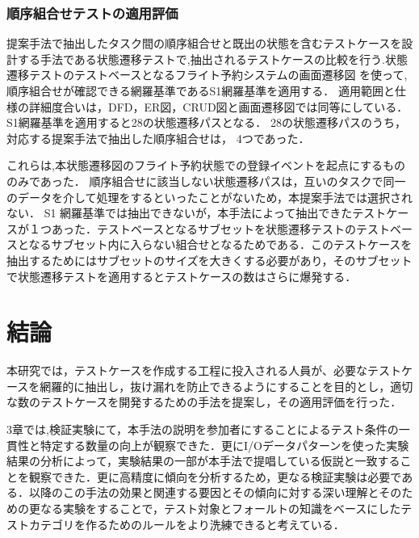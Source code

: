 \documentclass[10pt,a4j]{jarticle}
\begin{document}
\subsubsection{順序組合せテストの適用評価} \label{sec:5-2-2}
提案手法で抽出したタスク間の順序組合せと既出の状態を含むテストケースを設計する手法である状態遷移テストで,抽出されるテストケースの比較を行う.状態遷移テストのテストベースとなるフライト予約システムの画面遷移図
を使って,順序組合せが確認できる網羅基準であるS1網羅基準を適用する．
適用範囲と仕様の詳細度合いは，DFD，ER図，CRUD図と画面遷移図では同等にしている．
S1網羅基準を適用すると28の状態遷移パスとなる．
28の状態遷移パスのうち，対応する提案手法で抽出した順序組合せは，
4つであった．

これらは,本状態遷移図のフライト予約状態での登録イベントを起点にするもののみであった．
順序組合せに該当しない状態遷移パスは，互いのタスクで同一のデータを介して処理をするといったことがないため，本提案手法では選択されない．
S1 網羅基準では抽出できないが，本手法によって抽出できたテストケースが１つあった．テストベースとなるサブセットを状態遷移テストのテストベースとなるサブセット内に入らない組合せとなるためである．このテストケースを抽出するためにはサブセットのサイズを大きくする必要があり，そのサブセットで状態遷移テストを適用するとテストケースの数はさらに爆発する．

\section{結論} \label{chap:6}

本研究では，テストケースを作成する工程に投入される人員が、必要なテストケースを網羅的に抽出し，抜け漏れを防止できるようにすることを目的とし，適切な数のテストケースを開発するための手法を提案し，その適用評価を行った．

3章では,検証実験にて，本手法の説明を参加者にすることによるテスト条件の一貫性と特定する数量の向上が観察できた．更にI/Oデータパターンを使った実験結果の分析によって，実験結果の一部が本手法で提唱している仮説と一致することを観察できた．更に高精度に傾向を分析するため，更なる検証実験は必要である．以降のこの手法の効果と関連する要因とその傾向に対する深い理解とそのための更なる実験をすることで，テスト対象とフォールトの知識をベースにしたテストカテゴリを作るためのルールをより洗練できると考えている．
\end{document}
